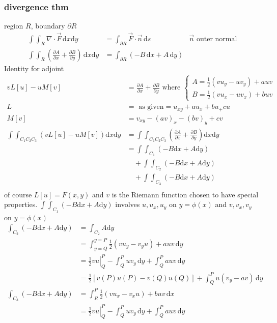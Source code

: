 \documentclass{article}
\begin{document}
\subsubsection*{divergence thm}
region $R$, boundary $\partial R$
\begin{align*}
  \int\int_R{\nabla\cdot \vec{F}\,\mathrm{d}x\mathrm{d}y}&=\int_{\partial R}{\vec{F}\cdot\vec{n}\,\mathrm{d}s}&\vec{n}\text{ outer normal}\\
  \int\int_R{\left(\frac{\partial A}{\partial x}+\frac{\partial B}{\partial y}\right)\,\mathrm{d}x\mathrm{d}y}&=\int_{\partial R}{(-B\,\mathrm{d}x+A\,\mathrm{d}y)}
\end{align*}
Identity for adjoint
\begin{align*}
  v L[u]-uM[v]&=\frac{\partial A}{\partial x}+\frac{\partial B}{\partial y}\text{ where }\begin{cases}A=\frac{1}{2}(vu_y-uv_y)+auv\\B=\frac{1}{2}(vu_x-uv_x)+buv\end{cases}\\
  L&=\text{ as given}=u_{xy}+au_x+bu_+cu\\
  M[v]&=v_{xy}-(av)_x-(bv)_y+cv\\
  \int\int_{C_1C_2C_3}{(vL[u]-uM[v])\mathrm{d}x\mathrm{d}y}&=\int\int_{C_1C_2C_3}{(\frac{\partial A}{\partial x}+\frac{\partial B}{\partial y})\mathrm{d}x\mathrm{d}y}\\
  &=\int\int_{C_1}{(-B\mathrm{d}x+A\mathrm{d}y)}\\
  &\quad+\int\int_{C_2}{(-B\mathrm{d}x+A\mathrm{d}y)}\\
  &\quad+\int\int_{C_3}{(-B\mathrm{d}x+A\mathrm{d}y)}\\
\end{align*}
of course $L[u]=F(x,y)$ and $v$ is the Riemann function chosen to have special properties.
$\int\int_{C_1}{(-B\mathrm{d}x+A\mathrm{d}y)}$ involves $u,u_x,u_y$ on $y=\phi(x)$ and $v,v_x,v_y$ on $y=\phi(x)$
\begin{align*}
  \int_{C_2}{(-B\mathrm{d}x+A\mathrm{d}y)}&=\int_{C_2}{A\mathrm{d}y}\\
  &=\int_{y=Q}^{y=P}{\frac{1}{2}(vu_y-v_yu)+auv\,\mathrm{d}y}\\
  &=\left.\frac{1}{2}vu\right\rvert_Q^P-\int_Q^P{uv_y\,\mathrm{d}y}+\int_Q^P{auv\,\mathrm{d}y}\\
  &=\frac{1}{2}\left[v(P)u(P)-v(Q)u(Q)\right]+\int_{Q}^P{u(v_y-av)\,\mathrm{d}y}\\
  \int_{C_3}{(-B\mathrm{d}x+A\mathrm{d}y)}&=\int_R^P{\frac{1}{2}(vu_x-v_xu)+buv\,\mathrm{d}x}\\
  &=\left.\frac{1}{2}vu\right\rvert_Q^P-\int_Q^P{uv_y\,\mathrm{d}y}+\int_Q^P{auv\,\mathrm{d}y}\\
\end{align*}
\end{document}
